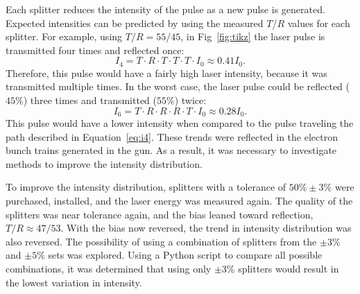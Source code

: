 Each splitter reduces the intensity of the pulse as a new pulse is generated. Expected intensities
can be predicted by using the measured $T$/$R$ values for each splitter. For example, using $T/R=55/45$,
in Fig~\ref{fig:tikz} the laser pulse is transmitted four times and reflected once: 
\begin{equation}\label{eq:i4}
I_4 =  T \cdot R \cdot T \cdot T \cdot T \cdot I_0 \approx 0.41 I_0.
\end{equation}
 Therefore, this pulse would have a fairly high laser intensity, because it was transmitted multiple times. 
In the worst case, the laser pulse could be reflected ($45\%$) three times and transmitted ($55\%$) twice: 
\begin{equation}\label{eq:i6}
I_6 =  T \cdot R \cdot R \cdot R \cdot T \cdot  I_0 \approx 0.28 I_0.
\end{equation}
This pulse would have a lower intensity when compared to the pulse traveling the path described in Equation~\ref{eq:i4}.
These trends were reflected in the electron bunch trains generated in the gun.
As a result, it was necessary to investigate methods to improve the intensity distribution. 

To improve the intensity distribution, splitters with a tolerance of $50\%\pm3\%$ were purchased, 
installed, and the laser energy was measured again. The quality of the splitters was near tolerance 
again, and the bias leaned toward reflection, $T/R \approx 47/53$.  With the bias now reversed, 
the trend in intensity distribution was also reversed. The possibility of using a combination 
of splitters from the $\pm3\%$ and $\pm5\%$ sets was explored. 
Using a Python script to compare all possible combinations, it was determined that using only 
$\pm3\%$ splitters would result in the lowest variation in intensity. 

